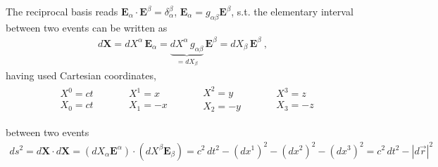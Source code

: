 \documentclass[letterpaper,10pt,english]{jupyterBook}
\begin{document}
\sphinxAtStartPar
The reciprocal basis reads \(\mathbf{E}_{\alpha} \cdot \mathbf{E}^{\beta} = \delta_{\alpha}^{\beta}\), \(\mathbf{E}_{\alpha} = g_{\alpha \beta} \mathbf{E}^{\beta}\), s.t. the elementary interval between two events can be written as
\begin{equation*}
\begin{split}d \mathbf{X} = d X^{\alpha} \, \mathbf{E}_{\alpha} = \underbrace{d X^{\alpha} \, g_{\alpha \beta}}_{= dX_{\beta}} \, \mathbf{E}^{\beta} = d X_{\beta} \, \mathbf{E}^{\beta} \ ,\end{split}
\end{equation*}
\sphinxAtStartPar
having used Cartesian coordinates,
\begin{equation*}
\begin{split}
  \begin{aligned}  & X^0 = c t \\  & X_0 = c t \end{aligned} \qquad
  \begin{aligned}  & X^1 =   x \\  & X_1 =  -x \end{aligned} \qquad
  \begin{aligned}  & X^2 =   y \\  & X_2 =  -y \end{aligned} \qquad
  \begin{aligned}  & X^3 =   z \\  & X_3 =  -z \end{aligned}
\end{split}
\end{equation*}


\sphinxAtStartPar
{} between two events
\begin{equation*}
\begin{split}d s^2 = d \mathbf{X} \cdot d \mathbf{X} = \left( dX_{\alpha} \mathbf{E}^{\alpha} \right) \cdot \left( dX^{\beta} \mathbf{E}_{\beta} \right) = c^2 \, d t^2 - (dx^1)^2 - (dx^2)^2 - (dx^3)^2 = c^2 \, dt^2 - |d \vec{r}|^2 \end{split}
\end{equation*}
\end{document}
